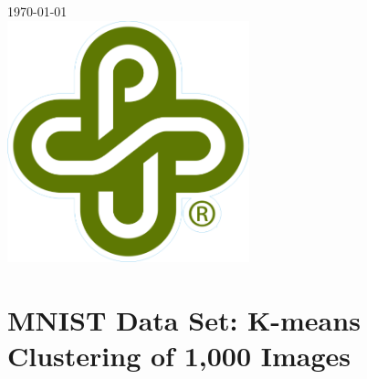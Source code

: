\documentclass[12pt]{article}
\begin{document}
\begin{titlepage}
		
		
		{\large \today}\\[0.7cm] %
		
		
		\includegraphics[width=7cm]{PSU_LOGO.png}\\[.5cm] %
		
		
		\vfill %
		
	\end{titlepage}
	\newpage

	
	\section{ MNIST Data Set: K-means Clustering of 1,000 Images}
	
\end{document}
